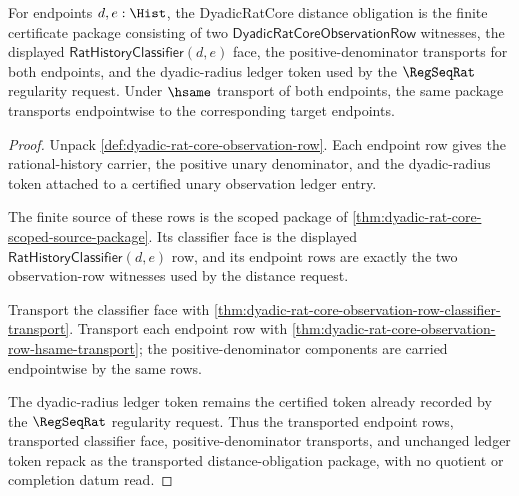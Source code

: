 \begin{theorem}
\label{thm:dyadic-rat-core-distance-obligation}
For endpoints $d,e:\Hist$, the DyadicRatCore distance obligation is the finite
certificate package consisting of two
$\mathsf{DyadicRatCoreObservationRow}$ witnesses, the displayed
$\mathsf{RatHistoryClassifier}(d,e)$ face, the positive-denominator transports
for both endpoints, and the dyadic-radius ledger token used by the $\RegSeqRat$
regularity request. Under $\hsame$ transport of both endpoints, the same
package transports endpointwise to the corresponding target endpoints.
\end{theorem}
\begin{proof}
Unpack \autoref{def:dyadic-rat-core-observation-row}. Each endpoint row gives
the rational-history carrier, the positive unary denominator, and the
dyadic-radius token attached to a certified unary observation ledger entry.

The finite source of these rows is the scoped package of
\autoref{thm:dyadic-rat-core-scoped-source-package}. Its classifier face is the
displayed $\mathsf{RatHistoryClassifier}(d,e)$ row, and its endpoint rows are
exactly the two observation-row witnesses used by the distance request.

Transport the classifier face with
\autoref{thm:dyadic-rat-core-observation-row-classifier-transport}. Transport
each endpoint row with
\autoref{thm:dyadic-rat-core-observation-row-hsame-transport}; the
positive-denominator components are carried endpointwise by the same rows.

The dyadic-radius ledger token remains the certified token already recorded by
the $\RegSeqRat$ regularity request. Thus the transported endpoint rows,
transported classifier face, positive-denominator transports, and unchanged
ledger token repack as the transported distance-obligation package, with no
quotient or completion datum read.
\end{proof}

